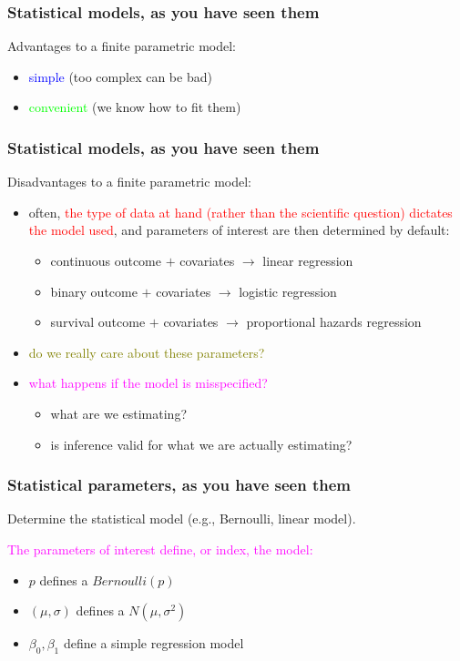 \documentclass[12pt, 
hyperref={colorlinks=true, linkcolor=blue, urlcolor=cyan}]{beamer}
\begin{document}
\begin{frame}
\frametitle{Statistical models, as you have seen them}
Advantages to a finite parametric model: \vspace{-0.3cm}
\begin{itemize}
\item \textcolor{blue}{simple} (too complex can be bad)
\item \textcolor{lime}{convenient} (we know how to fit them)
\end{itemize}

\end{frame}

\begin{frame}
\frametitle{Statistical models, as you have seen them}
Disadvantages to a finite parametric model: \vspace{-0.3cm}
\begin{itemize}
\item often, \textcolor{red}{the type of data at hand (rather than the scientific question) dictates the model used}, and parameters of interest are then determined by default:
\begin{itemize}
\item continuous outcome $+$ covariates $\rightarrow$ linear regression
\item binary outcome $+$ covariates $\rightarrow$ logistic regression
\item survival outcome $+$ covariates $\rightarrow$ proportional hazards regression
\end{itemize}
\item \textcolor{olive}{do we really care about these parameters?}
\item \textcolor{magenta}{what happens if the model is misspecified?}
\begin{itemize}
\item what are we estimating?
\item is inference valid for what we are actually estimating?
\end{itemize}
\end{itemize}
\end{frame}

\begin{frame}
\frametitle{Statistical parameters, as you have seen them}
Determine the statistical model (e.g., Bernoulli, linear model). 

\textcolor{magenta}{The parameters of interest define, or index, the model:} \vspace{-0.3cm}
\begin{itemize}
\item $p$ defines a $Bernoulli(p)$
\item $(\mu, \sigma)$ defines a $N(\mu, \sigma^2)$
\item $\beta_0, \beta_1$ define a simple regression model
\end{itemize}

\end{frame}
\end{document}

